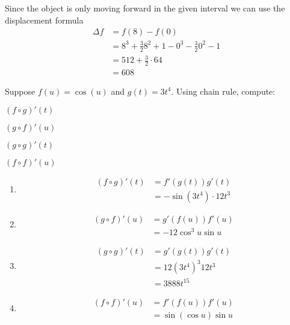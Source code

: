 \documentclass{hwset}
\begin{document}
	\item
	\begin{solution}
		Since the object is only moving forward in the given interval we can use the
		displacement formula
		\begin{align*}
			\Delta f &= f(8) - f(0) \\
			&= 8^3 + \frac{3}{2} 8^2 + 1 - 0^3 - \frac{3}{2} 0^2 - 1 \\
			&= 512 + \frac{3}{2}\cdot 64 \\
			&= \boxed{608}
		\end{align*}
	\end{solution}
\ee

\begin{problem}[3.] 
	Suppose $f(u)=\cos(u)$ and $g(t)=3t^{4}$. Using chain rule, compute:
	\be
		\item $(f\circ g)'(t)$
		\item $(g\circ f)'(u)$
		\item $(g\circ g)'(t)$
		\item $(f\circ f)'(u)$
	\ee
\end{problem}

\begin{enumerate}
	\item \begin{solution}
		\begin{align*}
			(f \circ g)'(t) &= f'(g(t)) g'(t)	\\
			&= \boxed{-\sin (3t^4) \cdot 12t^3}
		\end{align*}
	\end{solution}
	\item \begin{solution}
		\begin{align*}
			(g \circ f)'(u) &= g'(f(u)) f'(u) \\
			&= \boxed{-12 \cos^3 u \sin u}
		\end{align*}
	\end{solution}
	\item \begin{solution}
		\begin{align*}
			(g\circ g)'(t) &= g'(g(t)) g'(t) \\
			&= 12(3t^4)^3 12t^3 \\
			&= \boxed{3888 t^{15}}
		\end{align*}
	\end{solution}
	\item \begin{solution}
		\begin{align*}
			(f\circ f)'(u) &= f'(f(u)) f'(u) \\
			&= \boxed{\sin (\cos u) \sin u}
		\end{align*}
	\end{solution}
\end{enumerate}
\end{document}
